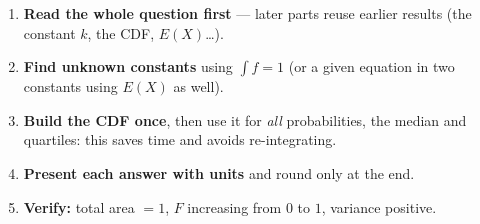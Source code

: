 \documentclass[11pt]{article}
\begin{document}
\begin{methode}
\begin{enumerate}
\item \textbf{Read the whole question first} — later parts reuse earlier results (the constant $k$, the CDF, $E(X)$\dots).
\item \textbf{Find unknown constants} using $\int f = 1$ (or a given equation in two constants using $E(X)$ as well).
\item \textbf{Build the CDF once}, then use it for \emph{all} probabilities, the median and quartiles: this saves time and avoids re-integrating.
\item \textbf{Present each answer with units} and round only at the end.
\item \textbf{Verify:} total area $=1$, $F$ increasing from $0$ to $1$, variance positive.
\end{enumerate}
\end{methode}
\end{document}
